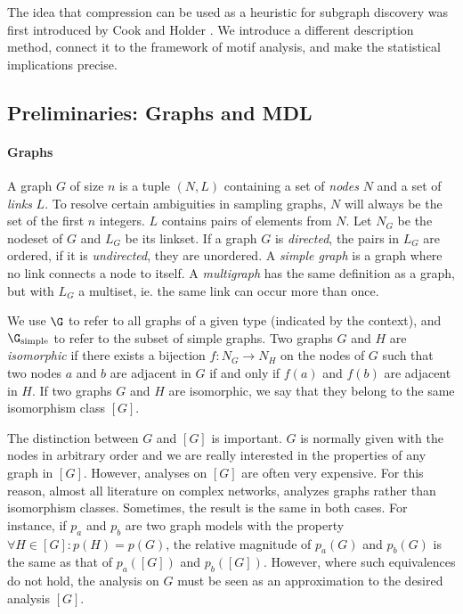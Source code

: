 The idea that compression can be used as a heuristic for subgraph discovery was first introduced by Cook and Holder \cite{cook1994substructure}. We introduce a different description method, connect it to the framework of motif analysis, and make the statistical implications precise.

\subsection{Preliminaries: Graphs and MDL}
\label{section:preliminaries}

\paragraph{Graphs} A graph $G$ of size $n$ is a tuple $(N, L)$ containing a set of \emph{nodes} $N$ and a set of \emph{links} $L$. To resolve certain ambiguities in sampling graphs, $N$ will always be the set of the first $n$ integers. $L$ contains pairs of elements from $N$. Let $N_G$ be the nodeset of $G$ and $L_G$ be its linkset. If a graph $G$ is \emph{directed}, the pairs in $L_G$ are ordered, if it is \emph{undirected}, they are unordered. A \emph{simple graph} is a graph where no link connects a node to itself. A \emph{multigraph} has the same definition as a graph, but with $L_G$ a multiset, ie. the same link can occur more than once.

We use $\G$ to refer to all graphs of a given type (indicated by the context), and $\G_\text{simple}$ to refer to the subset of simple graphs. Two graphs $G$ and $H$ are \emph{isomorphic} if there exists a bijection $f: N_G \to N_H$ on the nodes of $G$ such that two nodes $a$ and $b$ are adjacent in $G$ if and only if $f(a)$ and $f(b)$ are adjacent in $H$. If two graphs $G$ and $H$ are isomorphic, we say that they belong to the same isomorphism class $[G]$.

The distinction between $G$ and $[G]$ is important. $G$ is normally given with the nodes in arbitrary order and we are really interested in the properties of any graph in $[G]$. However, analyses on $[G]$ are often very expensive. For this reason, almost all literature on complex networks, analyzes graphs rather than isomorphism classes. Sometimes, the result is the same in both cases. For instance, if $p_a$ and $p_b$ are two graph models with the property $\forall H \in [G]: p(H) = p(G)$, the relative magnitude of $p_a(G)$ and $p_b(G)$ is the same as that of $p_a([G])$ and $p_b([G])$. However, where such equivalences do not hold, the analysis on $G$ must be seen as an approximation to the desired analysis $[G]$.

